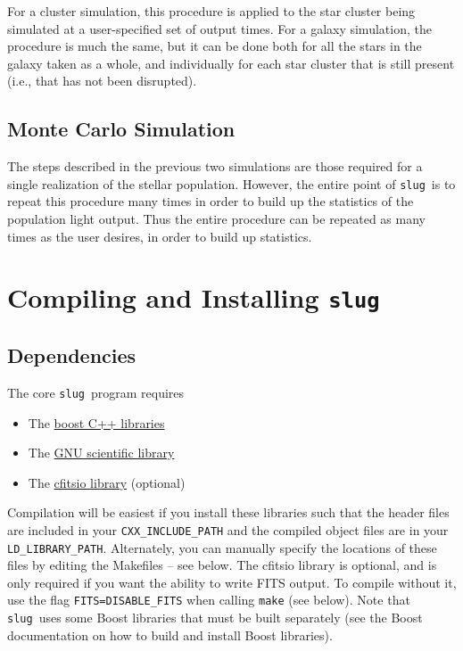 \documentclass[12pt]{article}
\newcommand{\slug}{\texttt{slug}}
\begin{document}
For a cluster simulation, this procedure is applied to the star cluster being simulated at a user-specified set of output times. For a galaxy simulation, the procedure is much the same, but it can be done both for all the stars in the galaxy taken as a whole, and individually for each star cluster that is still present (i.e., that has not been disrupted).

\subsection{Monte Carlo Simulation}

The steps described in the previous two simulations are those required for a single realization of the stellar population. However, the entire point of \slug\ is to repeat this procedure many times in order to build up the statistics of the population light output. Thus the entire procedure can be repeated as many times as the user desires, in order to build up statistics.

\section{Compiling and Installing \slug}

\subsection{Dependencies}

The core \slug\ program requires
\begin{itemize}
\item The \href{http://www.boost.org/}{boost C++ libraries}
\item The \href{http://www.gnu.org/software/gsl/}{GNU scientific library}
\item The \href{http://heasarc.gsfc.nasa.gov/fitsio/fitsio.html}{cfitsio library} (optional)
\end{itemize}
Compilation will be easiest if you install these libraries such that the header files are included in your \verb=CXX_INCLUDE_PATH= and the compiled object files are in your \verb=LD_LIBRARY_PATH=. Alternately, you can manually specify the locations of these files by editing the Makefiles -- see below. The cfitsio library is optional, and is only required if you want the ability to write FITS output. To compile without it, use the flag \verb!FITS=DISABLE_FITS! when calling \verb=make= (see below). Note that \slug\ uses some Boost libraries that must be built separately (see the Boost 
documentation on how to build and install Boost libraries).
\end{document}
